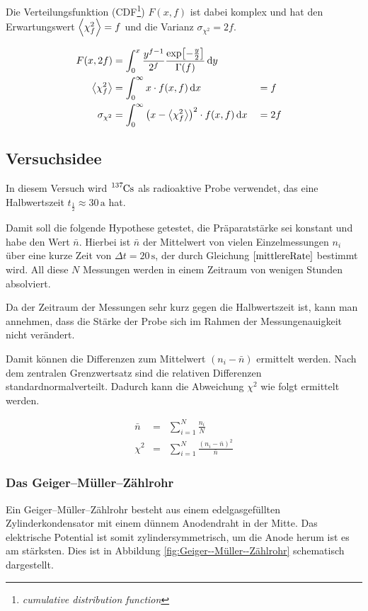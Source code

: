 \documentclass[12pt,a4paper]{scrartcl}
\numberwithin{equation}{section} %
\begin{document}
Die Verteilungsfunktion (CDF\footnote{\emph{cumulative distribution function}}) $F(x, f)$ ist dabei komplex und hat den Erwartungswert $\expval{\chi_f^2}=f$ und die Varianz $\sigma_{\chi^2}=2f$.

\begin{align}
    F(x, 2f) &=
        \int_0^x
            \frac{y^{f-1}}{2^f}
                \frac{\exp[-\frac{y}{2}]}{\Gamma(f)}
            \,\mathrm dy \\
    \expval{\chi_f^2} &=
        \int_0^\infty x\cdot f(x, f)
            \,\mathrm dx
        &&= f \\
    \sigma_{\chi^2} &=
        \int_0^\infty \left(x - \expval{\chi_f^2}\right)^2 \cdot f(x, f)
            \,\mathrm dx
         &&=2f
\end{align}

\hypertarget{versuchsidee}{%
\subsection{Versuchsidee}\label{versuchsidee}}

In diesem Versuch wird $\ce{^{137}Cs}$ als radioaktive Probe verwendet, das eine Halbwertszeit $t_\frac{1}{2}\approx 30\,\mathrm a$ hat.

Damit soll die folgende Hypothese getestet, die Präparatstärke sei konstant und habe den Wert $\bar n$. Hierbei ist $\bar n$ der Mittelwert von vielen Einzelmessungen $n_i$ über eine kurze Zeit von $\Delta t=20\,\mathrm s$, der durch Gleichung $\eqref{mittlereRate}$ bestimmt wird. All diese $N$ Messungen werden in einem Zeitraum von wenigen Stunden absolviert.

Da der Zeitraum der Messungen sehr kurz gegen die Halbwertszeit ist, kann man annehmen, dass die Stärke der Probe sich im Rahmen der Messungenauigkeit nicht verändert.

Damit können die Differenzen zum Mittelwert $(n_i-\bar n)$ ermittelt werden. Nach dem zentralen Grenzwertsatz sind die relativen Differenzen standardnormalverteilt. Dadurch kann die Abweichung $\chi^2$ wie folgt ermittelt werden.

\begin{eqnarray}
    \bar n &=& \sum_{i=1}^N \frac{n_i}{N} \label{mittlereRate} \\
    \chi^2 &=& \sum_{i=1}^N \frac{(n_i-\bar n)^2}{\bar n} \label{ChiSquared}
\end{eqnarray}

\subsubsection{Das Geiger--Müller--Zählrohr}
\label{Geiger--Müller--Zählrohr}
Ein Geiger--Müller--Zählrohr besteht aus einem edelgasgefüllten Zylinderkondensator mit einem dünnem Anodendraht in der Mitte. Das elektrische Potential ist somit zylindersymmetrisch, um die Anode herum ist es am stärksten. Dies ist in Abbildung \ref{fig:Geiger--Müller--Zählrohr} schematisch dargestellt.
\end{document}
